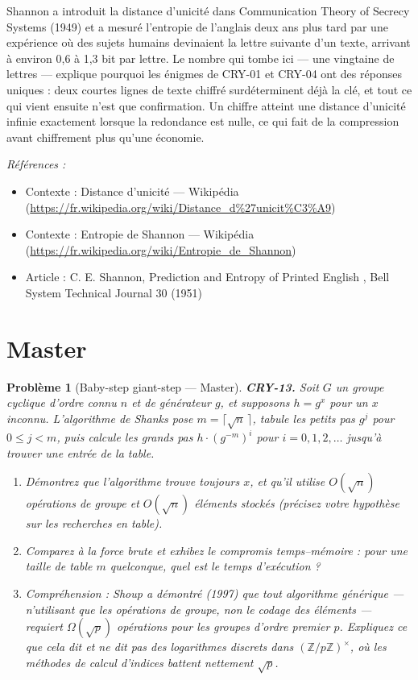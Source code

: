 \documentclass[11pt]{article}
\newtheorem{problem}{Problème}
\newenvironment{refs}{\par\small\noindent\emph{Références :}\begin{itemize}\setlength\itemsep{0pt}}{\end{itemize}\normalsize}
\begin{document}
\noindent Shannon a introduit la distance d'unicité dans \og{} Communication Theory of
Secrecy Systems \fg{} (1949) et a mesuré l'entropie de l'anglais deux ans plus tard par une
expérience où des sujets humains devinaient la lettre suivante d'un texte, arrivant à environ
0,6 à 1,3 bit par lettre. Le nombre qui tombe ici --- une vingtaine de lettres --- explique
pourquoi les énigmes de CRY-01 et CRY-04 ont des réponses uniques : deux courtes lignes de
texte chiffré surdéterminent déjà la clé, et tout ce qui vient ensuite n'est que
confirmation. Un chiffre atteint une distance d'unicité infinie exactement lorsque la
redondance est nulle, ce qui fait de la compression avant chiffrement plus qu'une
économie.

\begin{refs}
\item Contexte : Distance d'unicité --- Wikipédia (\url{https://fr.wikipedia.org/wiki/Distance_d%27unicit%C3%A9})
\item Contexte : Entropie de Shannon --- Wikipédia (\url{https://fr.wikipedia.org/wiki/Entropie_de_Shannon})
\item Article : C. E. Shannon, \og{} Prediction and Entropy of Printed English \fg{}, Bell System Technical Journal 30 (1951)
\end{refs}

\bigskip


\section*{Master}

\begin{problem}[{Baby-step giant-step --- Master}]
\textbf{CRY-13.} Soit $G$ un groupe cyclique d'ordre connu
$n$ et de générateur $g$, et supposons $h = g^x$ pour un $x$ inconnu. L'algorithme de
Shanks pose $m = \lceil \sqrt n\, \rceil$, tabule les \og{} petits pas \fg{} $g^j$
pour $0 \le j < m$, puis calcule les \og{} grands pas \fg{} $h \cdot (g^{-m})^i$ pour
$i = 0, 1, 2, \dots$ jusqu'à trouver une entrée de la table.
\begin{enumerate}
\item[(a)] Démontrez que l'algorithme trouve toujours
$x$, et qu'il utilise $O(\sqrt n)$ opérations de groupe et $O(\sqrt n)$ éléments
stockés (précisez votre hypothèse sur les recherches en table).
\item[(b)] Comparez à la force brute
et exhibez le compromis temps--mémoire : pour une taille de table $m$ quelconque, quel est
le temps d'exécution ?
\item[(c)] Compréhension : Shoup a démontré (1997) que tout algorithme
\textit{générique} --- n'utilisant que les opérations de groupe, non le codage des éléments ---
requiert $\Omega(\sqrt p)$ opérations pour les groupes d'ordre premier $p$. Expliquez ce
que cela dit et ne dit pas des logarithmes discrets dans $(\mathbb{Z}/p\mathbb{Z})^\times$,
où les méthodes de calcul d'indices battent nettement $\sqrt p$.
\end{enumerate}

\end{problem}
\end{document}
